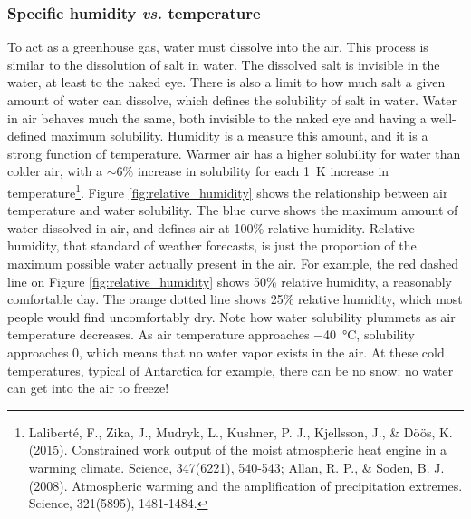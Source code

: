 \subsubsection{Specific humidity \textit{vs.} temperature}
To act as a greenhouse gas, water must dissolve into the air. This process is similar to the dissolution of salt in water. The dissolved salt is invisible in the water, at least to the naked eye. There is also a limit to how much salt a given amount of water can dissolve, which defines the solubility of salt in water. Water in air behaves much the same, both invisible to the naked eye and having a well-defined maximum solubility. Humidity is a measure this amount, and it is a strong function of temperature. Warmer air has a higher solubility for water than colder air, with a $\sim 6\%$ increase in solubility for each \SI{1}{\kelvin} increase in temperature\footnote{Lalibert\'{e}, F., Zika, J., Mudryk, L., Kushner, P. J., Kjellsson, J., \& D\"{o}\"{o}s, K. (2015). Constrained work output of the moist atmospheric heat engine in a warming climate. Science, 347(6221), 540-543; Allan, R. P., \& Soden, B. J. (2008). Atmospheric warming and the amplification of precipitation extremes. Science, 321(5895), 1481-1484.}. Figure \ref{fig:relative_humidity} shows the relationship between air temperature and water solubility. The blue curve shows the maximum amount of water dissolved in air, and defines air at 100\% relative humidity. Relative humidity, that standard of weather forecasts, is just the proportion of the maximum possible water actually present in the air. For example, the red dashed line on Figure \ref{fig:relative_humidity} shows 50\% relative humidity, a reasonably comfortable day. The orange dotted line shows 25\% relative humidity, which most people would find uncomfortably dry. Note how water solubility plummets as air temperature decreases. As air temperature approaches \SI{-40}{\celsius}, solubility approaches 0, which means that no water vapor exists in the air. At these cold temperatures, typical of Antarctica for example, there can be no snow: no water can get into the air to freeze!\\

